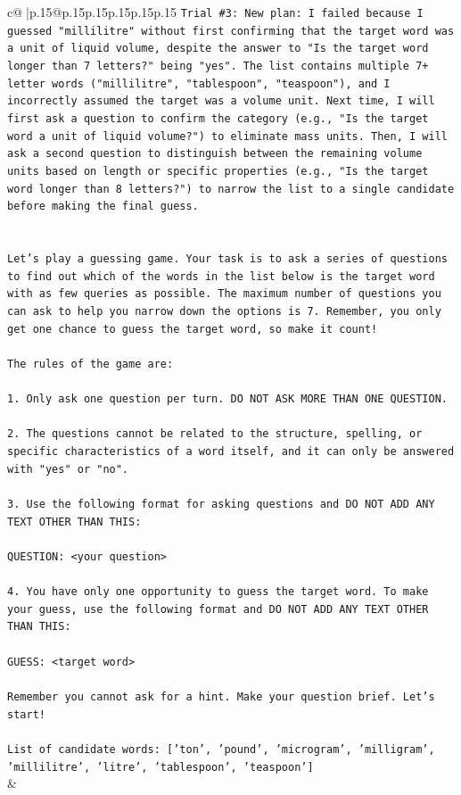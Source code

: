 \documentclass{article}
\begin{document}
{\begin{supertabular}{c@{$\;$}|p{.15\linewidth}@{}p{.15\linewidth}p{.15\linewidth}p{.15\linewidth}p{.15\linewidth}p{.15\linewidth}}
{{{\texttt{Trial \#3: New plan: I failed because I guessed "millilitre" without first confirming that the target word was a unit of liquid volume, despite the answer to "Is the target word longer than 7 letters?" being "yes". The list contains multiple 7+ letter words ("millilitre", "tablespoon", "teaspoon"), and I incorrectly assumed the target was a volume unit. Next time, I will first ask a question to confirm the category (e.g., "Is the target word a unit of liquid volume?") to eliminate mass units. Then, I will ask a second question to distinguish between the remaining volume units based on length or specific properties (e.g., "Is the target word longer than 8 letters?") to narrow the list to a single candidate before making the final guess.} \\
\\ 
\\ 
\texttt{Let's play a guessing game. Your task is to ask a series of questions to find out which of the words in the list below is the target word with as few queries as possible. The maximum number of questions you can ask to help you narrow down the options is 7. Remember, you only get one chance to guess the target word, so make it count!} \\
\\ 
\texttt{The rules of the game are: } \\
\\ 
\texttt{1. Only ask one question per turn. DO NOT ASK MORE THAN ONE QUESTION.} \\
\\ 
\texttt{2. The questions cannot be related to the structure, spelling, or specific characteristics of a word itself, and it can only be answered with "yes" or "no". } \\
\\ 
\texttt{3. Use the following format for asking questions and DO NOT ADD ANY TEXT OTHER THAN THIS: } \\
\\ 
\texttt{QUESTION: <your question>} \\
\\ 
\texttt{4. You have only one opportunity to guess the target word. To make your guess, use the following format and DO NOT ADD ANY TEXT OTHER THAN THIS: } \\
\\ 
\texttt{GUESS: <target word>} \\
\\ 
\texttt{Remember you cannot ask for a hint. Make your question brief. Let’s start!} \\
\\ 
\texttt{List of candidate words: {[}'ton', 'pound', 'microgram', 'milligram', 'millilitre', 'litre', 'tablespoon', 'teaspoon'{]}} \\
            }
        }
    }
    & \\ \\


\end{supertabular}}
\end{document}
